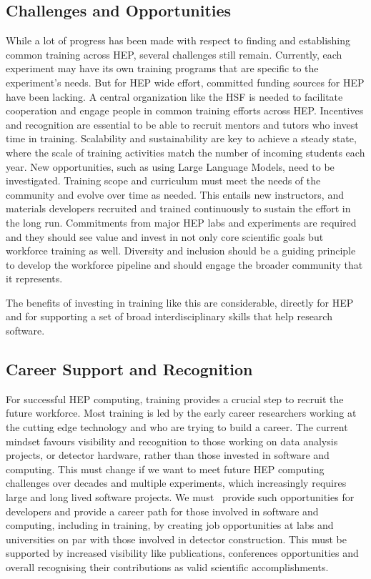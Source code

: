 \documentclass[10pt,a4paper]{article}
\begin{document}
\subsection{Challenges and
Opportunities}\label{challenges-and-opportunities}

While a lot of progress has been made with respect to finding and
establishing common training across HEP, several challenges still
remain. Currently, each experiment may have its own training programs
that are specific to the experiment's needs. But for HEP wide effort,
committed funding sources for HEP have been lacking. A central
organization like the HSF is needed to facilitate cooperation and engage
people in common training efforts across HEP. Incentives and recognition
are essential to be able to recruit mentors and tutors who invest time
in training. Scalability and sustainability are key to achieve a steady
state, where the scale of training activities match the number of
incoming students each year. New opportunities, such as using Large
Language Models, need to be investigated. Training scope and curriculum
must meet the needs of the community and evolve over time as needed.
This entails new instructors, and materials developers recruited and
trained continuously to sustain the effort in the long run. Commitments
from major HEP labs and experiments are required and they should see
value and invest in not only core scientific goals but workforce
training as well. Diversity and inclusion should be a guiding principle
to develop the workforce pipeline and should engage the broader
community that it represents.

The benefits of investing in training like this are considerable,
directly for HEP and for supporting a set of broad interdisciplinary
skills that help research software.

\subsection{Career Support and
Recognition}\label{career-support-and-recognition}

For successful HEP computing, training provides a crucial step to
recruit the future workforce. Most training is led by the early career
researchers working at the cutting edge technology and who are trying to
build a career. The current mindset favours visibility and recognition
to those working on data analysis projects, or detector hardware, rather
than those invested in software and computing. This must change if we
want to meet future HEP computing challenges over decades and multiple
experiments, which increasingly requires large and long lived software
projects. We must~\cite{22} provide such opportunities for developers and
provide a career path for those involved in software and computing,
including in training, by creating job opportunities at labs and
universities on par with those involved in detector construction. This
must be supported by increased visibility like publications, conferences
opportunities and overall recognising their contributions as valid
scientific accomplishments.
\end{document}
